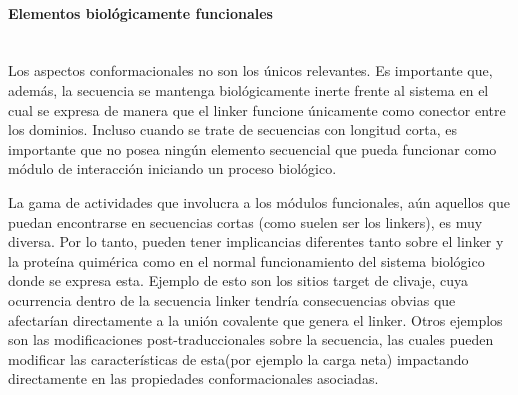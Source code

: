 \paragraph{Elementos biológicamente funcionales} \hspace{0pt} \\ \indent 
% 
% 
Los aspectos conformacionales no son los únicos relevantes. 
Es importante que, además, la secuencia se mantenga biológicamente inerte frente al sistema en el cual se expresa de manera que el linker funcione únicamente como conector entre los dominios.
Incluso cuando se trate de secuencias con longitud corta, es importante que no posea ningún elemento secuencial que pueda funcionar como módulo de interacción iniciando un proceso biológico. 

La gama de actividades que involucra a los módulos funcionales, aún aquellos que puedan encontrarse en secuencias cortas (como suelen ser los linkers), es muy diversa. Por lo tanto, pueden tener implicancias diferentes 
tanto sobre el linker y la proteína quimérica como en el normal funcionamiento del sistema biológico donde se expresa esta. %
Ejemplo de esto son los sitios target de clivaje, cuya ocurrencia dentro de la secuencia linker tendría consecuencias obvias que afectarían directamente a la unión covalente que genera el linker.
Otros ejemplos son las modificaciones post-traduccionales sobre la secuencia, las cuales pueden modificar las características de esta(por ejemplo la carga neta) impactando directamente en las propiedades conformacionales asociadas.



